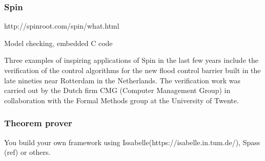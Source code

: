 \subsubsection{Spin}

http://spinroot.com/spin/what.html

Model checking, embedded C code

Three examples of inspiring applications of Spin in the last few years include the verification of the control algorithms for the new flood control barrier built in the late nineties near Rotterdam in the Netherlands. The verification work was carried out by the Dutch firm CMG (Computer Management Group) in collaboration with the Formal Methods group at the University of Twente.

\subsubsection{Theorem prover}

You build your own framework using Issabelle(https://isabelle.in.tum.de/), Spass (ref) or others.


